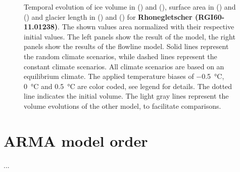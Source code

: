 \begin{figure}[p]
  \caption{Temporal evolution of ice volume in () and (), surface area in () and () and glacier length in () and () for \textbf{Rhonegletscher (RGI60-11.01238)}. The shown values area normalized with their respective initial values. The left panels show the result of the \vas{} model, the right panels show the results of the flowline model. Solid lines represent the random climate scenarios, while dashed lines represent the constant climate scenarios. All climate scenarios are based on an equilibrium climate. The applied temperature biases of \SI{-.5}{\celsius}, \SI{0}{\celsius} and \SI{+.5}{\celsius} are color coded, see legend for details. The dotted line indicates the initial volume. The light gray lines represent the volume evolutions of the other model, to facilitate comparisons.}
  \label{fig:Rhonegletscher}
\end{figure}

\chapter{ARMA model order}\label{appendix_B}
\thispagestyle{plain}

...

